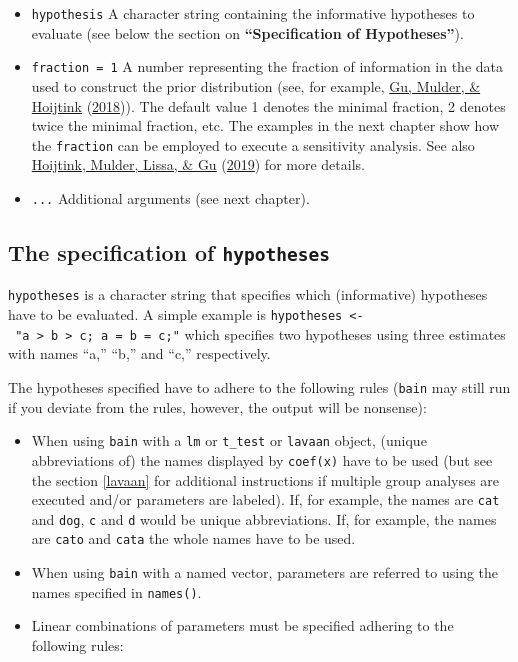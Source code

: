 \documentclass[
]{book}
\providecommand{\tightlist}{%
  \setlength{\itemsep}{0pt}\setlength{\parskip}{0pt}}
\begin{document}
\begin{itemize}
\item
  \texttt{hypothesis} A character string containing the informative hypotheses to evaluate
  (see below the section on \textbf{``Specification of Hypotheses''}).
\item
  \texttt{fraction\ =\ 1} A number representing the fraction of information in the data used to construct the prior distribution (see, for example, \protect\hyperlink{ref-gu2018approximated}{Gu, Mulder, \& Hoijtink} (\protect\hyperlink{ref-gu2018approximated}{2018})). The default value 1 denotes the minimal fraction, 2 denotes twice the minimal fraction, etc. The examples in the next chapter show how the \texttt{fraction} can be employed to execute a sensitivity analysis. See also \protect\hyperlink{ref-hoijtink2019tutorial}{Hoijtink, Mulder, Lissa, \& Gu} (\protect\hyperlink{ref-hoijtink2019tutorial}{2019}) for more details.
\item
  \texttt{...} Additional arguments (see next chapter).
\end{itemize}

\hypertarget{the-specification-of-hypotheses}{%
\subsection{\texorpdfstring{The specification of \texttt{hypotheses}}{The specification of hypotheses}}\label{the-specification-of-hypotheses}}

\texttt{hypotheses} is a character string that specifies which (informative)
hypotheses have to be evaluated. A simple example is \texttt{hypotheses\ \textless{}-\ "a\ \textgreater{}\ b\ \textgreater{}\ c;\ a\ =\ b\ =\ c;"} which specifies two hypotheses using three estimates with
names ``a,'' ``b,'' and ``c,'' respectively.

The hypotheses specified have to adhere to the following rules (\texttt{bain} may still run if you
deviate from the rules, however, the output will be nonsense):

\begin{itemize}
\tightlist
\item
  When using \texttt{bain} with a \texttt{lm} or \texttt{t\_test} or \texttt{lavaan} object,
  (unique abbreviations of) the names
  displayed by \texttt{coef(x)} have to be used (but see the section \ref{lavaan} for additional instructions if multiple group
  analyses are executed and/or parameters are labeled). If,
  for example, the names are \texttt{cat} and \texttt{dog}, \texttt{c}
  and \texttt{d} would be unique abbreviations. If, for example, the names are \texttt{cato}
  and \texttt{cata} the whole
  names have to be used.
\item
  When using \texttt{bain} with a named vector, parameters are referred to using
  the names specified in \texttt{names()}.
\item
  Linear combinations of parameters must be specified adhering to the
  following rules:
\end{itemize}
\end{document}
